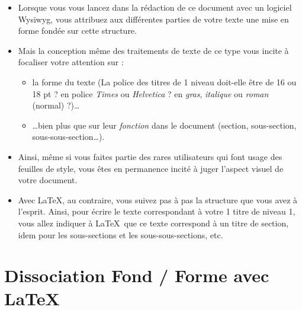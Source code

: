 \begin{itemize}
\item Lorsque vous vous lancez dans la rédaction de ce document avec
  un logiciel Wysiwyg, vous attribuez aux différentes parties de votre
  texte une mise en forme fondée sur cette structure.
\item Mais la conception même des traitements de texte de ce type vous
  incite à focaliser votre attention sur :
  \begin{itemize}
  \item la forme du texte (La police des titres de 1 niveau
    doit-elle être de 16 ou 18 pt ? en police \emph{Times} ou
    \emph{Helvetica} ? en \emph{gras}, \emph{italique} ou \emph{roman}
    (normal) ?)\ldots
  \item \ldots bien plus que sur leur \emph{fonction} dans le document
    (section, sous-section, sous-sous-section\ldots).
  \end{itemize}
\item Ainsi, même si vous faites partie des rares utilisateurs qui
  font usage des feuilles de style, vous êtes en permanence incité à
  juger l'aspect visuel de votre document.
\item Avec \LaTeX, au contraire, vous suivez pas à pas la structure
  que vous avez à l'esprit.  Ainsi, pour écrire le texte correspondant
  à votre 1 titre de niveau 1, vous allez indiquer à \LaTeX\
  que ce texte correspond à un titre de section, idem pour les
  sous-sections et les sous-sous-sections, etc.
\end{itemize}


\section{Dissociation Fond / Forme avec \LaTeX}

